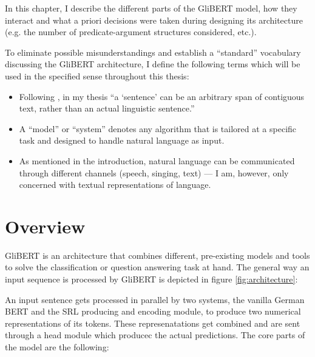 
\label{chap:4_architecture}

In this chapter, I describe the different parts of the GliBERT model, how they
interact and what a priori decisions were taken during designing its architecture
(e.g. the number of predicate-argument structures considered, etc.).

To eliminate possible misunderstandings and establish a ``standard'' vocabulary discussing the GliBERT
architecture, I define the following terms which will be used in the specified sense throughout
this thesis:

\begin{itemize}
  \item Following \cite{devlin2018bert}, in my thesis ``a `sentence' can be an arbitrary span of contiguous text, rather
    than an actual linguistic sentence.''
  \item A ``model'' or ``system'' denotes any algorithm that is tailored at a specific task and designed
    to handle natural language as input.
  \item As mentioned in the introduction, natural language can be communicated through different channels (speech, singing, text)
    --- I am, however, only concerned with textual representations of language.
\end{itemize}



\section{Overview}

GliBERT is an architecture that combines different, pre-existing models and
tools to solve the classification or question answering task at hand. The
general way an input sequence is processed by GliBERT is depicted in figure
\ref{fig:architecture}:



An input sentence gets processed in parallel by two systems, the vanilla German BERT
and the SRL producing and encoding module, to produce two numerical representations
of its tokens. These represenatations get combined and are sent through a head module
which producec the actual predictions. The core parts of the model are the following:

